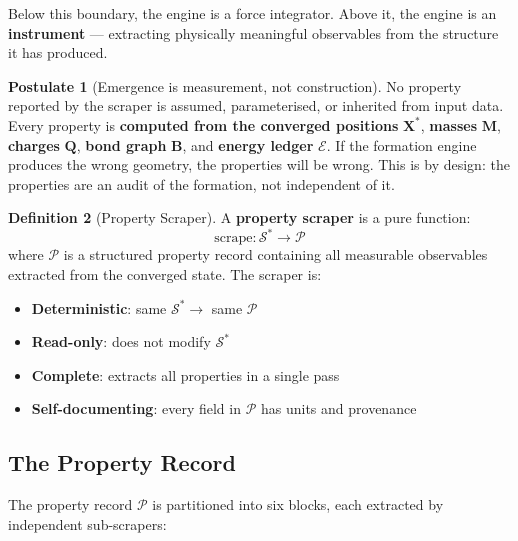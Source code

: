 \documentclass[11pt, a4paper, oneside]{article}
\theoremstyle{definition}
\newtheorem{defn}{Definition}[section]
\newtheorem{postulate}[defn]{Postulate}
\theoremstyle{remark}
\begin{document}
Below this boundary, the engine is a force integrator.  Above it, the
engine is an \textbf{instrument} — extracting physically meaningful
observables from the structure it has produced.

\begin{postulate}[Emergence is measurement, not construction]
\label{post:emergence}
No property reported by the scraper is assumed, parameterised, or
inherited from input data.  Every property is \textbf{computed from the
converged positions} $\mathbf{X}^*$, \textbf{masses} $\mathbf{M}$,
\textbf{charges} $\mathbf{Q}$, \textbf{bond graph} $\mathbf{B}$, and
\textbf{energy ledger} $\mathcal{E}$.  If the formation engine produces
the wrong geometry, the properties will be wrong.  This is by design:
the properties are an audit of the formation, not independent of it.
\end{postulate}

\begin{defn}[Property Scraper]
\label{def:scraper}
A \textbf{property scraper} is a pure function:
\begin{equation}
\text{scrape}: \mathcal{S}^* \to \mathcal{P}
\end{equation}
where $\mathcal{P}$ is a structured property record containing all
measurable observables extracted from the converged state.  The scraper
is:
\begin{itemize}
  \item \textbf{Deterministic}: same $\mathcal{S}^* \to$ same $\mathcal{P}$
  \item \textbf{Read-only}: does not modify $\mathcal{S}^*$
  \item \textbf{Complete}: extracts all properties in a single pass
  \item \textbf{Self-documenting}: every field in $\mathcal{P}$ has units
        and provenance
\end{itemize}
\end{defn}

\subsection{The Property Record}
\label{sec:property-record}

The property record $\mathcal{P}$ is partitioned into six blocks, each
extracted by independent sub-scrapers:
\end{document}
